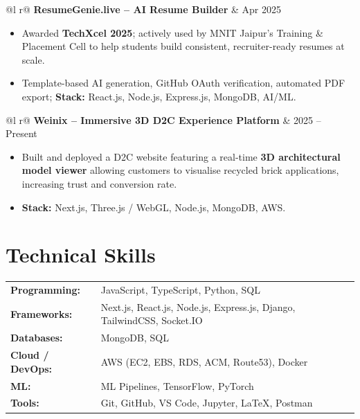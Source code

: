 \documentclass[a4paper,10pt]{article}
\begin{document}
\begin{tabularx}{\linewidth}{ @{}l r@{} }
\textbf{ResumeGenie.live -- AI Resume Builder} & \textcolor[HTML]{371e77}{Apr 2025} \\
\end{tabularx}
\vspace{-8pt}
\begin{itemize}[nosep, leftmargin=1.5em, itemsep=0pt, topsep=0pt]
\item Awarded \textbf{TechXcel 2025}; actively used by MNIT Jaipur's Training \& Placement Cell to help students build consistent, recruiter-ready resumes at scale.
\item Template-based AI generation, GitHub OAuth verification, automated PDF export; \textbf{Stack:} React.js, Node.js, Express.js, MongoDB, AI/ML.
\end{itemize}

\begin{tabularx}{\linewidth}{ @{}l r@{} }
\textbf{Weinix -- Immersive 3D D2C Experience Platform} & \textcolor[HTML]{371e77}{2025 -- Present} \\
\end{tabularx}
\vspace{-8pt}
\begin{itemize}[nosep, leftmargin=1.5em, itemsep=0pt, topsep=0pt]
\item Built and deployed a D2C website featuring a real-time \textbf{3D architectural model viewer} allowing customers to visualise recycled brick applications, increasing trust and conversion rate.
\item \textbf{Stack:} Next.js, Three.js / WebGL, Node.js, MongoDB, AWS.
\end{itemize}

\section{Technical Skills}
\color[HTML]{1C033C}
\begin{tabularx}{\linewidth}{@{}l X@{}}
\textbf{Programming:}    &  JavaScript, TypeScript, Python, SQL \\
\textbf{Frameworks:}     & Next.js, React.js, Node.js, Express.js, Django, TailwindCSS, Socket.IO \\
\textbf{Databases:}      & MongoDB, SQL \\
\textbf{Cloud / DevOps:} & AWS (EC2, EBS, RDS, ACM, Route53), Docker \\
\textbf{ML:}             & ML Pipelines, TensorFlow, PyTorch \\
\textbf{Tools:}          & Git, GitHub, VS Code, Jupyter, LaTeX, Postman \\
\end{tabularx}
\end{document}

